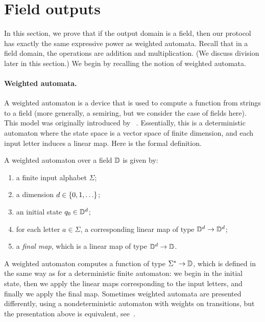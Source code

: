\section{Field outputs}
\label{sec:field-domain}
In this section, we prove that if the output domain is a field, then our protocol has exactly the same expressive power as weighted automata.
Recall that in a field domain, the operations are addition and multiplication. (We discuss division later in this section.)
We begin by recalling the notion of weighted automata.

\paragraph*{Weighted automata.}  A weighted automaton is a device that is used to compute a function from strings to a field (more generally, a semiring, but we consider the case of fields here). This model was originally introduced by \schutz~\cite{schutzenberger1961definition}. Essentially, this is a deterministic automaton where the state space is a vector space of finite dimension, and each input letter induces a linear map. Here is the formal definition. 

\begin{definition}
    \label{def:weighted-automaton}
    A weighted automaton over a field $\mathbb D$ is given by: 
    \begin{enumerate}
        \item a finite input alphabet $\Sigma$;
        \item a dimension $d \in \{0,1,\ldots\}$;
        \item an initial state $q_0 \in \mathbb D^d$;
        \item \label{it:weighted-definition-transitions} for each letter $a \in \Sigma$, a corresponding linear map of type $\mathbb D^d \to \mathbb D^d$;
        \item \label{it:weighted-definition-final} a \emph{final map}, which is a linear map of type $\mathbb D^d \to \mathbb D$. 
    \end{enumerate}
\end{definition}

A weighted automaton computes a function of type $\Sigma^* \to \mathbb D$, which is defined in the same way as for a deterministic finite automaton: we begin in the initial state, then we apply the linear maps corresponding to the input letters, and finally we apply the final map.
Sometimes weighted automata are presented differently, using a nondeterministic automaton with weights on transitions, but the presentation above is equivalent, see~\cite[Lemma 4.3]{bojanczyk_automata_2025}.

